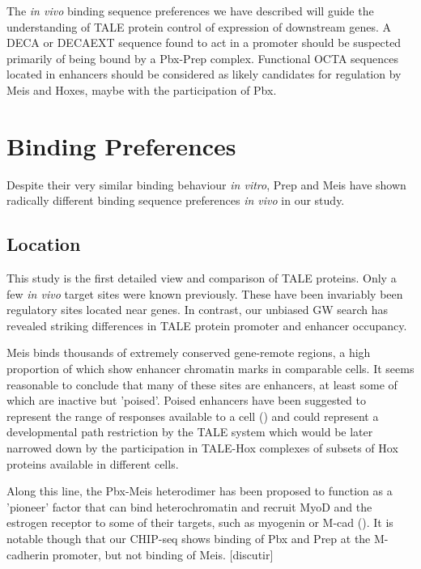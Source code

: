 The \textit{in vivo} binding sequence preferences we have  described will guide the understanding of \ac{TALE} protein control of expression of downstream genes. A \ac{DECA} or \ac{DECAEXT} sequence found to act in a promoter should be suspected primarily of being bound by a Pbx-Prep complex. Functional \ac{OCTA} sequences located in enhancers should be considered as likely candidates for regulation by Meis and Hoxes, maybe with the participation of Pbx. 

\section{Binding Preferences}

Despite their very similar binding behaviour \textit{in vitro}, Prep and Meis have shown radically different binding sequence preferences \textit{in vivo} in our study. 

\subsection{Location}

This study is the first detailed view and comparison of \ac{TALE} proteins. Only a few \textit{in vivo} target sites were known previously. These have been invariably been regulatory sites located near genes. In contrast, our unbiased \ac{GW} search has revealed striking differences in \ac{TALE} protein promoter and enhancer occupancy. 

Meis binds thousands of extremely conserved gene-remote regions, a high proportion of which show enhancer chromatin marks in comparable cells. It seems reasonable to conclude that many of these sites are enhancers, at least some of which are inactive but 'poised'. Poised enhancers have been suggested to represent the range of responses available to a cell (\cite{Creyghton2010}) and could represent a developmental path restriction by the \ac{TALE} system which would be later narrowed down by the participation in \ac{TALE}-Hox complexes of subsets of Hox proteins available in different cells. 

Along this line, the Pbx-Meis heterodimer has been proposed to function as a 'pioneer' factor that can bind heterochromatin and recruit MyoD and the estrogen receptor to some of their targets, such as myogenin or M-cad (\cite{Berkes2004,Magnani2011}). It is notable though that our \ac{CHIP}-seq shows binding of Pbx and Prep at the M-cadherin promoter, but not binding of Meis. [discutir]

